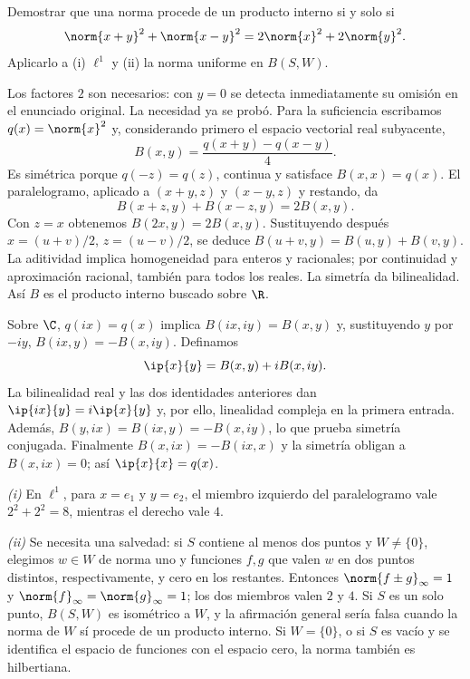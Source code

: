 \begin{ejercicio}\label{ej:lectura-29-3}
Demostrar que una norma procede de un producto interno si y solo si
\[
 \norm{x+y}^{2}+\norm{x-y}^{2}=2\norm{x}^{2}+2\norm{y}^{2}.
\]
Aplicarlo a (i) $\ell^{1}$ y (ii) la norma uniforme en $B(S,W)$.
\end{ejercicio}
\begin{solucion}
Los factores $2$ son necesarios: con $y=0$ se detecta inmediatamente su omisión en el enunciado original. La necesidad ya se probó. Para la suficiencia escribamos $q(x)=\norm{x}^{2}$ y, considerando primero el espacio vectorial real subyacente,
\[
 B(x,y)=\frac{q(x+y)-q(x-y)}4.
\]
Es simétrica porque $q(-z)=q(z)$, continua y satisface $B(x,x)=q(x)$. El paralelogramo, aplicado a $(x+y,z)$ y $(x-y,z)$ y restando, da
\[
 B(x+z,y)+B(x-z,y)=2B(x,y).
\]
Con $z=x$ obtenemos $B(2x,y)=2B(x,y)$. Sustituyendo después $x=(u+v)/2$, $z=(u-v)/2$, se deduce $B(u+v,y)=B(u,y)+B(v,y)$. La aditividad implica homogeneidad para enteros y racionales; por continuidad y aproximación racional, también para todos los reales. La simetría da bilinealidad. Así $B$ es el producto interno buscado sobre $\R$.

Sobre $\C$, $q(ix)=q(x)$ implica $B(ix,iy)=B(x,y)$ y, sustituyendo $y$ por $-iy$, $B(ix,y)=-B(x,iy)$. Definamos
\[
 \ip{x}{y}=B(x,y)+iB(x,iy).
\]
La bilinealidad real y las dos identidades anteriores dan $\ip{ix}{y}=i\ip{x}{y}$ y, por ello, linealidad compleja en la primera entrada. Además, $B(y,ix)=B(ix,y)=-B(x,iy)$, lo que prueba simetría conjugada. Finalmente $B(x,ix)=-B(ix,x)$ y la simetría obligan a $B(x,ix)=0$; así $\ip{x}{x}=q(x)$.

\emph{(i)} En $\ell^{1}$, para $x=e_1$ y $y=e_2$, el miembro izquierdo del paralelogramo vale $2^2+2^2=8$, mientras el derecho vale $4$.

\emph{(ii)} Se necesita una salvedad: si $S$ contiene al menos dos puntos y $W\ne\{0\}$, elegimos $w\in W$ de norma uno y funciones $f,g$ que valen $w$ en dos puntos distintos, respectivamente, y cero en los restantes. Entonces $\norm{f\pm g}_\infty=1$ y $\norm{f}_\infty=\norm{g}_\infty=1$; los dos miembros valen $2$ y $4$. Si $S$ es un solo punto, $B(S,W)$ es isométrico a $W$, y la afirmación general sería falsa cuando la norma de $W$ sí procede de un producto interno. Si $W=\{0\}$, o si $S$ es vacío y se identifica el espacio de funciones con el espacio cero, la norma también es hilbertiana.
\end{solucion}

